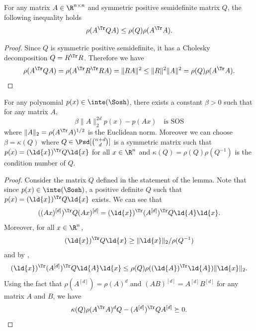 \documentclass[11pt,twoside,a4paper,openright]{uclouvain-thesis}
\begin{document}
\begin{mylem}
  \label{lem:svd}
  For any matrix $A \in \R^{n \times n}$ and symmetric positive semidefinite matrix $Q$,
  the following inequality holds
  \[ \rho(A^\Tr QA) \leq \rho(Q) \rho(A^\Tr A). \]
  \begin{proof}
    Since $Q$ is symmetric positive semidefinite,
    it has a Cholesky decomposition $Q = R^\Tr R$.
    Therefore we have
    \begin{equation*}
      \rho(A^\Tr Q A) = \rho (A^\Tr R^\Tr R A)%
      = \|R A\|^2 \leq \|R\|^2 \|A\|^2 = \rho(Q) \rho(A^\Tr A).
    \end{equation*}
  \end{proof}
\end{mylem}

\begin{mylem}
  \label{lem:sosbound}
  For any polynomial $p(x) \in \inte(\Sosh)$,
  there exists a constant $\beta > 0$
  such that for any matrix $A$,
  \[ \beta\|A\|_2^{2d} p(x) - p(Ax) \quad \text{is SOS} \]
  where $\|A\|_2 = \rho(A^\Tr A)^{1/2}$ is the Euclidean norm.
  Moreover we can choose $\beta = \kappa(Q)$ where $Q \in \Psd[{n+d \choose d}]$
  is a symmetric matrix such that $p(x) = (\ld{x})^\Tr Q \ld{x}$ for all $x \in \R^n$ %
  and $\kappa(Q) = \rho(Q) \rho(Q^{-1})$ is the condition number of $Q$.
  \begin{proof}
    Consider the matrix $Q$ defined in the statement of the lemma.
    Note that since $p(x) \in \inte(\Sosh)$, a positive definite $Q$ such that $p(x) = (\ld{x})^\Tr Q \ld{x}$ exists.
    We can see that
    \[ ((Ax)^{[d]})^\Tr Q(Ax)^{[d]} = (\ld{x})^\Tr (A^{[d]})^\Tr Q\ld{A}\ld{x}. \]
    Moreover, for all $x \in \R^n$,
    \[ (\ld{x})^\Tr Q\ld{x} \geq \|\ld{x}\|_2/\rho(Q^{-1}) \]
    and by ,
    \[ (\ld{x})^\Tr (A^{[d]})^\Tr Q\ld{A}\ld{x} \leq \rho(Q)\rho((\ld{A})^\Tr \ld{A})\|\ld{x}\|_2. \]
    Using the fact that $\rho(A^{[d]}) = \rho(A)^d$ and $(AB)^{[d]} = A^{[d]}B^{[d]}$ for any matrix $A$ and $B$,
    we have
    \[ \kappa(Q) \rho(A^\Tr A)^{d} Q - (A^{[d]})^\Tr QA^{[d]} \succeq 0. \]
  \end{proof}
\end{mylem}
\end{document}
